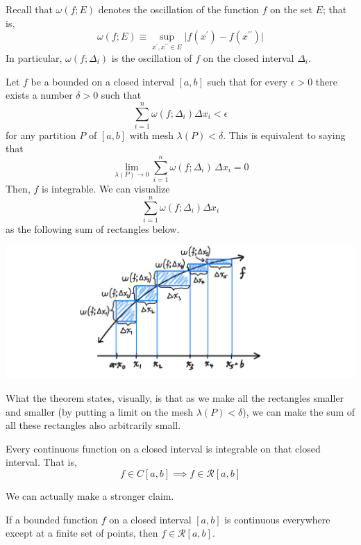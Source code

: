     Recall that $\omega(f; E)$ denotes the oscillation of the function $f$ on the set $E$; that is, 
    \[\omega(f; E) \equiv \sup_{x^\prime, x^{\prime\prime} \in E} \big| f(x^\prime) - f(x^{\prime\prime})\big|\]
    In particular, $\omega(f; \Delta_i)$ is the oscillation of $f$ on the closed interval $\Delta_i$. 

    \begin{theorem}
    Let $f$ be a bounded on a closed interval $[a, b]$ such that for every $\epsilon > 0$ there exists a number $\delta>0$ such that
    \[\sum_{i=1}^n \omega(f; \Delta_i) \Delta x_i < \epsilon\]
    for any partition $P$ of $[a, b]$ with mesh $\lambda(P) < \delta$. This is equivalent to saying that
    \[\lim_{\lambda(P) \rightarrow 0} \sum_{i = 1}^n \omega (f; \Delta_i) \, \Delta x_i = 0\]
    Then, $f$ is integrable. We can visualize
    \[\sum_{i=1}^n \omega(f; \Delta_i) \Delta x_i\]
    as the following sum of rectangles below. 
    \begin{center}
        \includegraphics[scale=0.25]{img/Sufficient_Condition_for_Integrability.PNG}
    \end{center}
    What the theorem states, visually, is that as we make all the rectangles smaller and smaller (by putting a limit on the mesh $\lambda(P)<\delta$), we can make the sum of all these rectangles also arbitrarily small. 
    \end{theorem}

    \begin{corollary}
    Every continuous function on a closed interval is integrable on that closed interval. That is, 
    \[f \in C[a, b] \implies f \in \mathcal{R}[a, b]\]
    \end{corollary}

    We can actually make a stronger claim. 

    \begin{corollary}
    If a bounded function $f$ on a closed interval $[a, b]$ is continuous everywhere except at a finite set of points, then $f \in \mathcal{R}[a, b]$. 
    \end{corollary}

